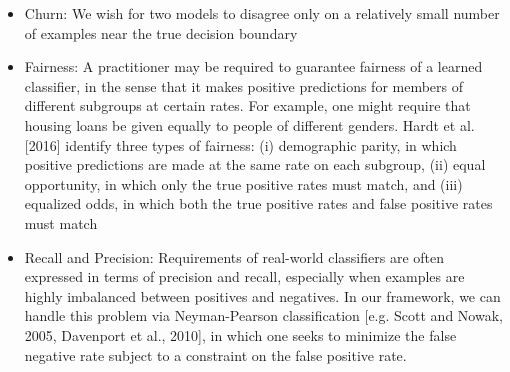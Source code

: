 \begin{example}
\begin{itemize}
\item  {Churn}: We wish for two models to disagree only on a relatively small
number of examples near the true decision boundary

\item Fairness: A practitioner may be required to guarantee fairness of a
learned classifier, in the sense that it makes positive predictions for
members of different subgroups at certain rates.  For example, one might
require that housing loans be given equally to people of different genders.
Hardt et al. [2016] identify three types of fairness: (i) demographic parity,
in which positive predictions are made at the same rate on each subgroup, (ii)
equal opportunity, in which only the true positive rates must match, and (iii)
equalized odds, in which both the true positive rates and false positive rates
must match

\item  Recall and Precision: Requirements of real-world classifiers are often
expressed in terms of precision and recall, especially when examples are
highly imbalanced between positives and negatives. In our framework, we can
handle this problem via Neyman-Pearson classification [e.g. Scott and Nowak,
2005, Davenport et al., 2010], in which one seeks to minimize the false
negative rate subject to a constraint on the false positive rate.

\end{itemize}


\end{example}
